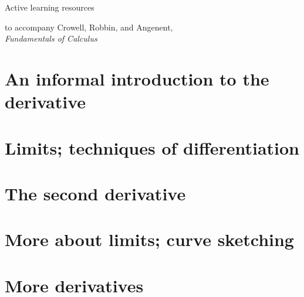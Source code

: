 \documentclass{beamer}
\begin{document}
\newcommand{\der}{\operatorname{d\!}{}}

\newcommand{\mygamma}{\textup{\textgamma}}



\begin{frame}{Active learning resources}

to accompany Crowell, Robbin, and Angenent,\\
 \emph{Fundamentals of Calculus}

\end{frame}

\tableofcontents

\section{An informal introduction to the derivative}




\section{Limits; techniques of differentiation}




\section{The second derivative}


\section{More about limits; curve sketching}



\section{More derivatives}

\end{document}
